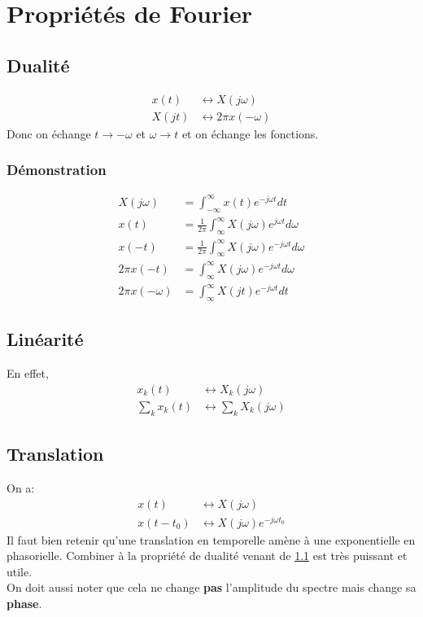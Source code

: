 \documentclass{report}
\begin{document}
\section{Propriétés de Fourier} \label{proprF}

\subsection{Dualité} \label{Dua}
\begin{align*}
x(t) & \longleftrightarrow X(j\omega)\\
X(jt) & \longleftrightarrow 2\pi x(-\omega)
\end{align*}
Donc on échange $t \rightarrow -\omega$ et $\omega \rightarrow t$ et on échange les fonctions.
\subsubsection{Démonstration}
\begin{align*}
X(j \omega) &= \int_{-\infty}^{\infty} x(t) e^{-j\omega t} dt\\
x(t) &= \frac{1}{2\pi} \int_{\infty}^{\infty} X(j\omega) e^{j\omega t} d\omega\\
x(-t) &= \frac{1}{2\pi} \int_{\infty}^{\infty} X(j\omega) e^{-j\omega t} d\omega\\
2 \pi x(-t) &= \int_{\infty}^{\infty} X(j\omega) e^{-j\omega t} d\omega\\
2 \pi x(-\omega) &= \int_{\infty}^{\infty} X(jt) e^{-j\omega t} dt
\end{align*}

\subsection{Linéarité}
En effet,
\begin{align*}
x_k(t) & \longleftrightarrow X_k(j\omega)\\
\sum_k x_k(t) & \longleftrightarrow \sum_k X_k(j\omega)
\end{align*}

\subsection{Translation}
On a:
\begin{align*}
x(t) & \longleftrightarrow X(j\omega)\\
x(t-t_0) & \longleftrightarrow X(j\omega)e^{-j \omega t_0}
\end{align*}
Il faut bien retenir qu'une translation en temporelle amène à une exponentielle en phasorielle. Combiner à la propriété de dualité venant de \ref{Dua} est très puissant et utile.\\
On doit aussi noter que cela ne change \textbf{pas} l'amplitude du spectre mais change sa \textbf{phase}.
\end{document}
